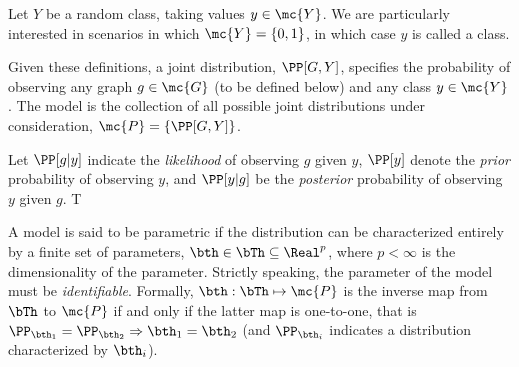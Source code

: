 
Let $Y$ be a random class, taking values $y \in \mc{Y}$.  We are particularly interested in scenarios in which $\mc{Y}=\{0,1\}$, in which case $y$ is called a class.






Given these definitions, a joint distribution, $\PP[G,Y]$, specifies the probability of observing any graph $g \in \mc{G}$ (to be defined below) and any class $y \in \mc{Y}$.  The model is the collection of all possible joint distributions under consideration, $\mc{P}=\{\PP[G,Y]\}$.


Let $\PP[g|y]$ indicate the \emph{likelihood} of observing $g$ given $y$, $\PP[y]$ denote the \emph{prior} probability of observing $y$, and $\PP[y|g]$ be the \emph{posterior} probability of observing $y$ given $g$.  T
 



A model is said to be parametric if the distribution can be characterized entirely by a finite set of parameters, $\bth \in \bTh \subseteq \Real^p$, where $p<\infty$ is the dimensionality of the parameter. Strictly speaking, the parameter of the model must be \emph{identifiable}.  Formally, $\bth: \bTh \mapsto \mc{P}$ is the inverse map from $\bTh$ to $\mc{P}$ if and only if the latter map is one-to-one, that is $\PP_{\bth_1}=\PP_{\bth_2} \Rightarrow \bth_1=\bth_2$ (and $\PP_{\bth_i}$ indicates a distribution characterized by $\bth_i$).






